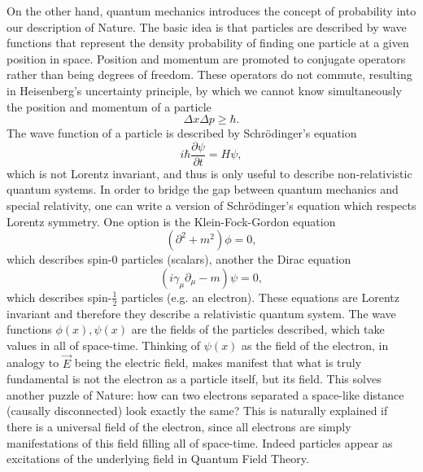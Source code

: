 On the other hand, quantum mechanics introduces the concept of probability into our description of Nature. The basic idea is that particles are described by wave functions that represent the density probability of finding one particle at a given position in space. Position and momentum are promoted to conjugate operators rather than being degrees of freedom. These operators do not commute, resulting in Heisenberg's uncertainty principle, by which we cannot know simultaneously the position and momentum of a particle
\begin{equation}
\Delta x\Delta p\geq\hbar.
\end{equation}
The wave function of a particle is described by Schrödinger's equation
\begin{equation}
i\hbar\frac{\partial\psi}{\partial t}=H\psi,
\end{equation}
which is not Lorentz invariant, and thus is only useful to describe non-relativistic quantum systems. In order to bridge the gap between quantum mechanics and special relativity, one can write a version of Schrödinger's equation which respects Lorentz symmetry. One option is the Klein-Fock-Gordon equation
\begin{equation}
\left(\partial^2+m^2\right)\phi=0,
\end{equation}
which describes spin-$0$ particles (scalars), another the Dirac equation
\begin{equation}
\label{ch_intro:eq:Dirac}
\left(i\gamma_{\mu}\partial_{\mu}-m\right)\psi=0,
\end{equation}
which describes spin-$\frac{1}{2}$ particles (e.g. an electron). These equations are Lorentz invariant and therefore they describe a relativistic quantum system. The wave functions $\phi(x),\psi(x)$ are the fields of the particles described, which take values in all of space-time. Thinking of $\psi(x)$ as the field of the electron, in analogy to $\vec{E}$ being the electric field, makes manifest that what is truly fundamental is not the electron as a particle itself, but its field. This solves another puzzle of Nature: how can two electrons separated a space-like distance (causally disconnected) look exactly the same? This is naturally explained if there is a universal field of the electron, since all electrons are simply manifestations of this field filling all of space-time. Indeed particles appear as excitations of the underlying field in Quantum Field Theory.

